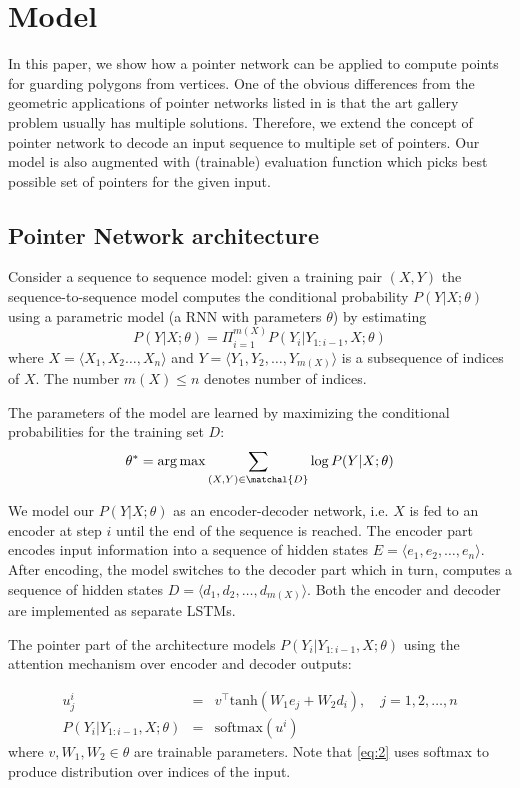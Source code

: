 \documentclass{article}
\begin{document}
\section{Model}

In this paper, we show how a pointer network \cite{paper/vinyals2017pointer} can be applied to compute points for guarding polygons from vertices.  One of the obvious differences from the geometric applications of pointer networks listed in \cite{paper/vinyals2017pointer} is that the art gallery problem usually has multiple solutions. Therefore, we extend the concept of pointer network to decode an input sequence to multiple set of pointers. Our model is also augmented with (trainable) evaluation function which picks best possible set of pointers for the given input.





\subsection{Pointer Network architecture}
Consider a sequence to sequence model: given a training pair $(X,Y)$ the sequence-to-sequence model computes the conditional probability $P(Y|X;\theta)$ using a parametric model (a RNN with parameters $\theta$) by estimating
$$P(Y|X;\theta)=\Pi_{i=1}^{m(X)} P(Y_i|Y_{1:i-1},X;\theta)$$ where $X=\langle X_1,X_2\ldots,X_n\rangle$ and $Y=\langle Y_1,Y_2,\ldots,Y_{m(X)} \rangle$ is a subsequence of indices of $X$. The number $m(X)\leq n$ denotes number of indices.



The parameters of the model are learned by maximizing the conditional probabilities for the training set $D$: $$\theta^*=\arg\max\sum_{(X,Y)\in \matchal{D}} \log P(Y|X;\theta)$$

We model our $P(Y|X;\theta)$ as an encoder-decoder network, i.e. $X$ is fed to an encoder at step $i$ until the end of the sequence is reached. The encoder part encodes input information into a sequence of hidden states $E=\langle e_1,e_2,\ldots,e_n\rangle$. After encoding, the model switches to the decoder part which in turn, computes a sequence of hidden states $D=\langle d_1,d_2,\ldots,d_{m(X)}\rangle$. Both the encoder and decoder are implemented as separate LSTMs.

The pointer part of the architecture models  $P(Y_i|Y_{1:i-1},X;\theta)$ using the attention mechanism over encoder and decoder outputs: 

\begin{eqnarray} 
u^i_j & = & v^\top \textrm{tanh}(W_1 e_j+W_2d_i), \quad j=1,2,\ldots,n \label{eq:1}   \\ 
P(Y_i|Y_{1:i-1},X;\theta) & = & \textrm{softmax}(u^i) \label{eq:2}
\end{eqnarray}
where $v,W_1,W_2\in \theta$ are trainable parameters. Note that \eqref{eq:2} uses softmax to produce distribution over indices of the input. 
\end{document}
